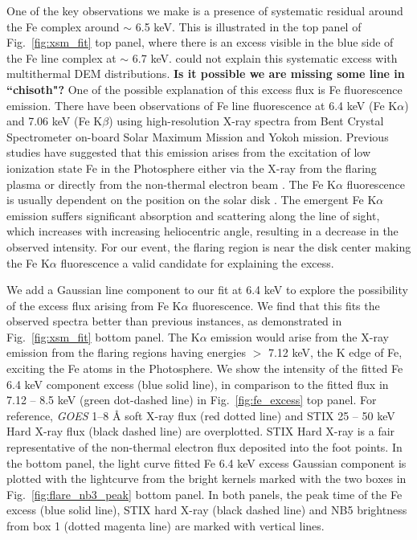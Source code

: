 \documentclass[12pt]{article}
\begin{document}
One of the key observations we make is a presence of systematic residual around the Fe complex around $\sim$ 6.5 keV. This is illustrated in the top panel of Fig.~\ref{fig:xsm_fit} top panel, where there is an excess visible in the blue side of the Fe line complex at $\sim$ 6.7 keV. \cite{mithun22} could not explain this systematic excess with multithermal DEM distributions. {\bf Is it possible we are missing some line in ``chisoth"?} One of the possible explanation of this excess flux is Fe fluorescence emission. There have been observations of Fe line fluorescence at 6.4 keV (Fe K$\alpha$) and 7.06 keV (Fe K$\beta$) \citep{neupert67,doscheck71,bai79,tanaka84,parmar84,phillips12} using high-resolution X-ray spectra from Bent Crystal Spectrometer on-board Solar Maximum Mission \citep[Bent/{\it SMM},][]{bent,smm} and Yokoh \citep{yokoh} mission. Previous studies have suggested that this emission arises from the excitation of low ionization state Fe in the Photosphere either via the X-ray from the flaring plasma \citep{bai79} or directly from the non-thermal electron beam \citep{phillips73}. The Fe K$\alpha$ fluorescence is usually dependent on the position on the solar disk \citep{parmar84}. The emergent Fe K$\alpha$ emission suffers significant absorption and scattering along the line of sight, which increases with increasing heliocentric angle, resulting in a decrease in the observed intensity. For our event, the flaring region is near the disk center making the Fe K$\alpha$ fluorescence a valid candidate for explaining the excess.

We add a Gaussian line component to our fit at 6.4 keV to explore the possibility of the excess flux arising from Fe K$\alpha$ fluorescence. We find that this fits the observed spectra better than previous instances, as demonstrated in Fig.~\ref{fig:xsm_fit} bottom panel. The K$\alpha$ emission would arise from the X-ray emission from the flaring regions having energies $>$ 7.12 keV, the K edge of Fe, exciting the Fe atoms in the Photosphere. We show the intensity of the fitted Fe 6.4 keV component excess (blue solid line), in comparison to the fitted flux in 7.12 {--} 8.5 keV (green dot-dashed line) in Fig.~\ref{fig:fe_excess} top panel. For reference, {\it GOES} 1{--}8 {\AA} soft X-ray flux (red dotted line) and STIX 25 {--} 50 keV Hard X-ray flux (black dashed line) are overplotted. STIX Hard X-ray is a fair representative of the non-thermal electron flux deposited into the foot points. In the bottom panel, the light curve fitted Fe 6.4 keV excess Gaussian component is plotted with the lightcurve from the bright kernels marked with the two boxes in Fig.~\ref{fig:flare_nb3_peak} bottom panel. In both panels, the peak time of the Fe excess (blue solid line), STIX hard X-ray (black dashed line) and NB5 brightness from box 1 (dotted magenta line) are marked with vertical lines.
\end{document}
